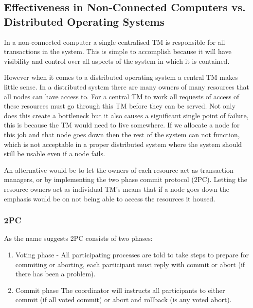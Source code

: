 \documentclass[a4paper,12pt]{article}
\begin{document}
\subsection*{Effectiveness in Non-Connected  Computers vs. Distributed Operating Systems}
In a non-connected computer a single centralised TM is responsible for all transactions in the system. 
This is simple to accomplish because it will have visibility and control over all aspects of the system in which it is contained. 

However when it comes to a distributed operating system a central TM makes little sense. 
In a distributed system there are many owners of many resources that all nodes can have access to.
For a central TM to work all requests of access of these resources must go through this TM before they can be served.
Not only does this create a bottleneck but it also causes a significant single point of failure, this is because the TM would need to live somewhere. 
If we allocate a node for this job and that node goes down then the rest of the system can not function, which is not acceptable in a proper distributed system where the system should still be usable even if a node fails.


An alternative would be to let the owners of each resource act as transaction managers, or by implementing the two phase commit protocol (2PC).
Letting the resource owners act as individual TM's means that if a node goes down the emphasis would be on not being able to access the resources it housed.

\subsubsection*{2PC}
As the name suggests 2PC consists of two phases:
\begin{enumerate}
    \item{Voting phase - All participating processes are told to take steps to prepare for commiting or aborting, each participant must reply with commit or abort (if there has been a problem).}
    \item{Commit phase  The coordinator will instructs all participants to either commit (if all voted commit) or abort and rollback (is any voted abort).}
\end{enumerate}






\vskip 0.2in
\newpage


\end{document}
